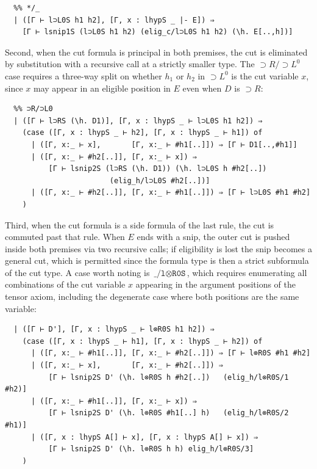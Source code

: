 \begin{lstlisting}
  %% */_
  | ([Γ ⊢ l⊃L0S h1 h2], [Γ, x : lhypS _ |- E]) ⇒
    [Γ ⊢ lsnip1S (l⊃L0S h1 h2) (elig_c/l⊃L0S h1 h2) (\h. E[..,h])]
\end{lstlisting}

Second, when the cut formula is principal in both premises, the cut is
eliminated by substitution with a recursive call at a strictly smaller
type. The ${\supset}R / {\supset}L^0$ case requires a three-way split on
whether $h_1$ or $h_2$ in ${\supset}L^0$ is the cut variable $x$, since
$x$ may appear in an eligible position in $E$ even when $D$ is
${\supset}R$:

\begin{lstlisting}
  %% ⊃R/⊃L0
  | ([Γ ⊢ l⊃RS (\h. D1)], [Γ, x : lhypS _ ⊢ l⊃L0S h1 h2]) ⇒
    (case ([Γ, x : lhypS _ ⊢ h2], [Γ, x : lhypS _ ⊢ h1]) of
      | ([Γ, x:_ ⊢ x],       [Γ, x:_ ⊢ #h1[..]]) ⇒ [Γ ⊢ D1[..,#h1]]
      | ([Γ, x:_ ⊢ #h2[..]], [Γ, x:_ ⊢ x]) ⇒
          [Γ ⊢ lsnip2S (l⊃RS (\h. D1)) (\h. l⊃L0S h #h2[..])
                        (elig_h/l⊃L0S #h2[..])]
      | ([Γ, x:_ ⊢ #h2[..]], [Γ, x:_ ⊢ #h1[..]]) ⇒ [Γ ⊢ l⊃L0S #h1 #h2]
    )
\end{lstlisting}

Third, when the cut formula is a side formula of the last rule, the cut
is commuted past that rule. When $E$ ends with a snip, the outer cut is
pushed inside both premises via two recursive calls; if eligibility is
lost the snip becomes a general cut, which is permitted since the
formula type is then a strict subformula of the cut type. A case worth
noting is $\texttt{\_/l} {\otimes} \texttt{R0S}$, which requires enumerating all combinations
of the cut variable $x$ appearing in the argument positions of the tensor
axiom, including the degenerate case where both positions are the same
variable:

\begin{lstlisting}
  | ([Γ ⊢ D'], [Γ, x : lhypS _ ⊢ l⊗R0S h1 h2]) ⇒
    (case ([Γ, x : lhypS _ ⊢ h1], [Γ, x : lhypS _ ⊢ h2]) of
      | ([Γ, x:_ ⊢ #h1[..]], [Γ, x:_ ⊢ #h2[..]]) ⇒ [Γ ⊢ l⊗R0S #h1 #h2]
      | ([Γ, x:_ ⊢ x],       [Γ, x:_ ⊢ #h2[..]]) ⇒
          [Γ ⊢ lsnip2S D' (\h. l⊗R0S h #h2[..])   (elig_h/l⊗R0S/1 #h2)]
      | ([Γ, x:_ ⊢ #h1[..]], [Γ, x:_ ⊢ x]) ⇒
          [Γ ⊢ lsnip2S D' (\h. l⊗R0S #h1[..] h)   (elig_h/l⊗R0S/2 #h1)]
      | ([Γ, x : lhypS A[] ⊢ x], [Γ, x : lhypS A[] ⊢ x]) ⇒
          [Γ ⊢ lsnip2S D' (\h. l⊗R0S h h) elig_h/l⊗R0S/3]
    )
\end{lstlisting}

